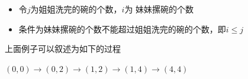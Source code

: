 \documentclass[punct]{beamer}
\begin{document}
\begin{frame}
\begin{minipage}{0.5\linewidth}
\end{minipage}

\pause
\begin{itemize}
    \item 令$j$为姐姐洗完的碗的个数，$i$为 妹妹摞碗的个数

    \item     条件为妹妹摞碗的个数不能超过姐姐洗完的碗的个数，即$i\le j$

\end{itemize}
上面例子可以叙述为如下的过程
\begin{center}
 $(0, 0) \rightarrow (0, 2)
\rightarrow (1, 2)
\rightarrow (1, 4)
\rightarrow (4, 4)$
\end{center}


\end{frame}
\end{document}
